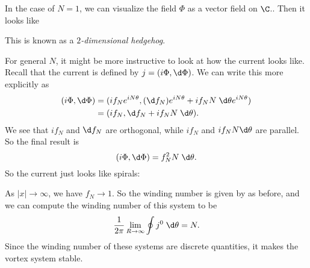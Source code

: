 \documentclass[a4paper]{article}
\begin{document}
In the case of $N = 1$, we can visualize the field $\Phi$ as a vector field on $\C$.. Then it looks like
\begin{center}
\end{center}
This is known as a \emph{$2$-dimensional hedgehog}.

For general $N$, it might be more instructive to look at how the current looks like. Recall that the current is defined by $j = (i\Phi, \d \Phi)$. We can write this more explicitly as
\begin{align*}
  (i\Phi, \d \Phi) &= (if_N e^{iN\theta}, (\d f_N) e^{iN\theta} + i f_N N\;\d \theta e^{iN\theta})\\
  &= (if_N,\d f_N + i f_N N\;\d \theta).
\end{align*}
We see that $if_N$ and $\d f_N$ are orthogonal, while $i f_N$ and $i f_N N \d \theta$ are parallel. So the final result is
\[
  (i\Phi, \d \Phi) = f_N^2 N\;\d \theta.
\]
So the current just looks like spirals:

\begin{center}
\end{center}

As $|x| \to \infty$, we have $f_N \to 1$. So the winding number is given by as before, and we can compute the winding number of this system to be
\[
  \frac{1}{2\pi} \lim_{R \to \infty} \oint j^0 \;\d \theta = N.
\]
Since the winding number of these systems are discrete quantities, it makes the vortex system stable.
\end{document}
